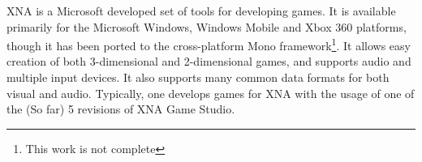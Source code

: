 XNA is a Microsoft developed set of tools for developing games. It is available
primarily for the Microsoft Windows, Windows Mobile and Xbox 360 platforms, though
it has been ported to the cross-platform Mono framework\footnote{This work is not
  complete}. It allows easy creation of both 3-dimensional and 2-dimensional games,
and supports audio and multiple input devices. It also supports many common data
formats for both visual and audio. Typically, one develops games for XNA with the
usage of one of the (So far) 5 revisions of XNA Game Studio.
